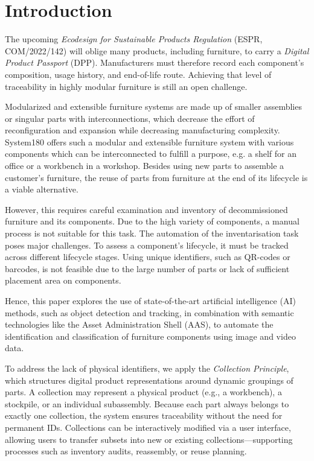 \documentclass[3p,times,procedia]{elsarticle}
\begin{document}

\section{Introduction}

The upcoming \emph{Ecodesign for Sustainable Products Regulation} (ESPR, COM/2022/142) will oblige many products, including furniture, to carry a \emph{Digital Product Passport} (DPP).  Manufacturers must therefore record each component’s composition, usage history, and end-of-life route.  Achieving that level of traceability in highly modular furniture is still an open challenge.

Modularized and extensible furniture systems are made up of smaller assemblies or singular parts with interconnections, which decrease the effort of reconfiguration and expansion while decreasing manufacturing complexity. System180 offers such a modular and extensible furniture system with various components which can be interconnected to fulfill a purpose, e.g. a shelf for an office or a workbench in a workshop. Besides using new parts to assemble a customer's furniture, the reuse of parts from furniture at the end of its lifecycle is a viable alternative. 

However, this requires careful examination and inventory of decommissioned furniture and its components. Due to the high variety of components, a manual process is not suitable for this task. The automation of the inventarisation task poses major challenges. To assess a component's lifecycle, it must be tracked across different lifecycle stages. Using unique identifiers, such as QR-codes or barcodes, is not feasible due to the large number of parts or lack of sufficient placement area on components.

Hence, this paper explores the use of state-of-the-art artificial intelligence (AI) methods, such as object detection and tracking, in combination with semantic technologies like the Asset Administration Shell (AAS), to automate the identification and classification of furniture components using image and video data.

To address the lack of physical identifiers, we apply the \textit{Collection Principle}, which structures digital product representations around dynamic groupings of parts. A collection may represent a physical product (e.g., a workbench), a stockpile, or an individual subassembly. Because each part always belongs to exactly one collection, the system ensures traceability without the need for permanent IDs. Collections can be interactively modified via a user interface, allowing users to transfer subsets into new or existing collections—supporting processes such as inventory audits, reassembly, or reuse planning.
\end{document}
